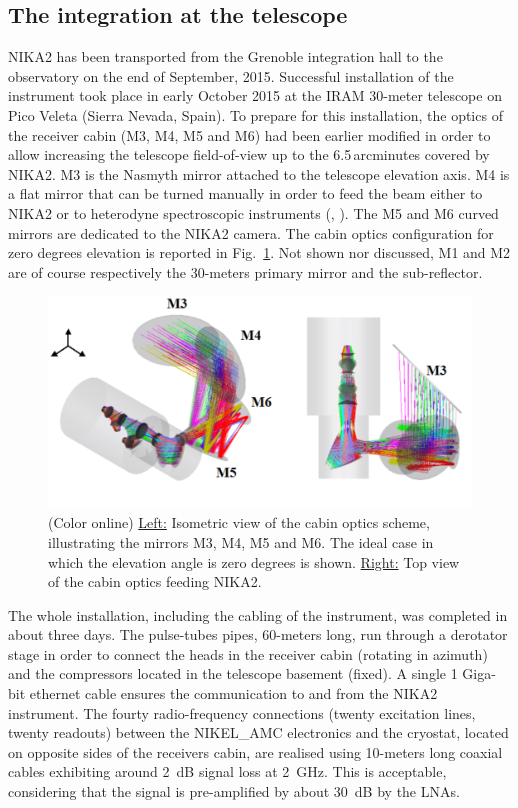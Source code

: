\documentclass[]{aa} %
\begin{document}
\subsection{The integration at the telescope}
\label{The integration at the telescope}

NIKA2 has been transported from the Grenoble integration hall to the observatory on the end of September, 2015. Successful installation of the instrument took place in early October 2015 at the IRAM 30-meter telescope on Pico Veleta (Sierra Nevada, Spain). To prepare for this installation, the optics of the receiver cabin (M3, M4, M5 and M6) had been earlier modified in order to allow increasing the telescope field-of-view up to the 6.5\,arcminutes covered by NIKA2. M3 is the Nasmyth mirror attached to the telescope elevation axis. M4 is a flat mirror that can be turned manually in order to feed the beam either to NIKA2 or to heterodyne spectroscopic instruments (\cite{Carter2012}, \cite{Schuster2004}). The M5 and M6 curved mirrors are dedicated to the NIKA2 camera. The cabin optics configuration for zero degrees elevation is reported in Fig.~\ref{figCabin}. Not shown nor discussed, M1 and M2 are of course respectively the 30-meters primary mirror and the sub-reflector. 

\begin{figure}[h]
   \centering
    \includegraphics[width=.85\linewidth]{figCabin.png}
      \caption{(Color online) \underline{Left:} Isometric view of the cabin optics scheme, illustrating the mirrors M3, M4, M5 and M6. The ideal case in which the elevation angle is zero degrees is shown. \underline{Right:} Top view of the cabin optics feeding NIKA2.}
         \label{figCabin}
\end{figure}

The whole installation, including the cabling of the instrument, was completed in about three days. The pulse-tubes pipes, 60-meters long, run through a derotator stage in order to connect the heads in the receiver cabin (rotating in azimuth) and the compressors located in the telescope basement (fixed). A single 1 Giga-bit ethernet cable ensures the communication to and from the NIKA2 instrument. The fourty radio-frequency connections (twenty excitation lines, twenty readouts) between the NIKEL\_AMC electronics and the cryostat, located on opposite sides of the receivers cabin, are realised using 10-meters long coaxial cables exhibiting around 2~dB signal loss at 2~GHz. This is acceptable, considering that the signal is pre-amplified by about 30~dB by the LNAs. 
\end{document}

